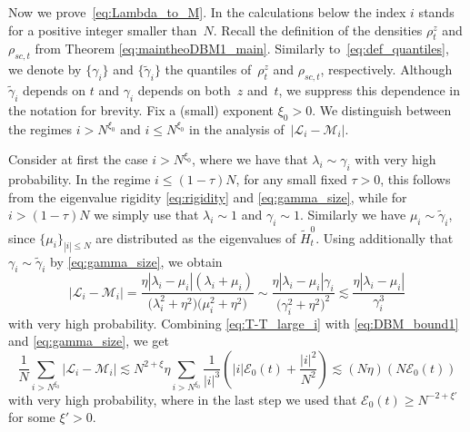 \documentclass[10pt]{amsart}
\numberwithin{equation}{section}
\begin{document}
Now we prove~\eqref{eq:Lambda_to_M}. In the calculations below the index $i$ stands for a positive integer smaller than~$N$. Recall the definition of the densities $\rho_t^z$ and $\rho_{sc,t}$ from Theorem \ref{eq:maintheoDBM1_main}. Similarly to~\eqref{eq:def_quantiles}, we denote by $\{\gamma_i\}$ and $\{\widetilde{\gamma}_i\}$ the quantiles of~$\rho^z_t$ and $\rho_{sc,t}$, respectively. Although~$\widetilde{\gamma}_i$ depends on $t$ and $\gamma_i$ depends on both~$z$ and~$t$, we suppress this dependence in the notation for brevity. Fix a (small) exponent $\xi_0>0$. We distinguish between the regimes $i> N^{\xi_0}$ and $i\le N^{\xi_0}$ in the analysis of~$|\mathscr{L}_i-\mathscr{M}_i|$. 


Consider at first the case $i>N^{\xi_0}$, where we have that $\lambda_i\sim \gamma_i$ with very high probability. In the regime $i\le (1-\tau)N$, for any small fixed $\tau>0$, this follows from the eigenvalue rigidity \eqref{eq:rigidity} and \eqref{eq:gamma_size}, while for $i>(1-\tau)N$ we simply use that $\lambda_i\sim 1$ and $\gamma_i\sim 1$. Similarly we have $\mu_i\sim \widetilde{\gamma}_i$, since $\{\mu_i\}_{|i|\le N}$ are distributed as the eigenvalues of $\widetilde{H}^0_t$. Using additionally that $\gamma_i\sim\widetilde{\gamma}_i$ by \eqref{eq:gamma_size}, we obtain
\begin{equation}
\left\vert \mathscr{L}_i-\mathscr{M}_i\right\vert =  \frac{\eta\left\vert \lambda_i-\mu_i\right\vert(\lambda_i+\mu_i)}{\big(\lambda_i^2 +\eta^2\big)\big(\mu_i^2 +\eta^2\big)} \sim \frac{\eta\left\vert \lambda_i-\mu_i\right\vert\gamma_i }{\big(\gamma_i^2 +\eta^2\big)^2}\lesssim \frac{\eta \left\vert \lambda_i-\mu_i\right\vert}{\gamma_i^3} 
\label{eq:T-T_large_i}
\end{equation}
with very high probability. Combining \eqref{eq:T-T_large_i} with \eqref{eq:DBM_bound1} and \eqref{eq:gamma_size}, we get
\begin{equation}
\frac{1}{N}\sum_{i> N^{\xi_0}} \left\vert \mathscr{L}_i-\mathscr{M}_i\right\vert \lesssim N^{2+\xi}\eta\sum_{i> N^{\xi_0}}\frac{1}{|i|^3}\left(|i|\mathcal{E}_0(t) + \frac{|i|^2}{N^2}\right)\lesssim (N\eta)(N\mathcal{E}_0(t))
\label{eq:T-T_large_i_fin}
\end{equation}
with very high probability, where in the last step we used that $\mathcal{E}_0(t)\ge N^{-2+\xi'}$ for some $\xi'>0$.
\end{document}
